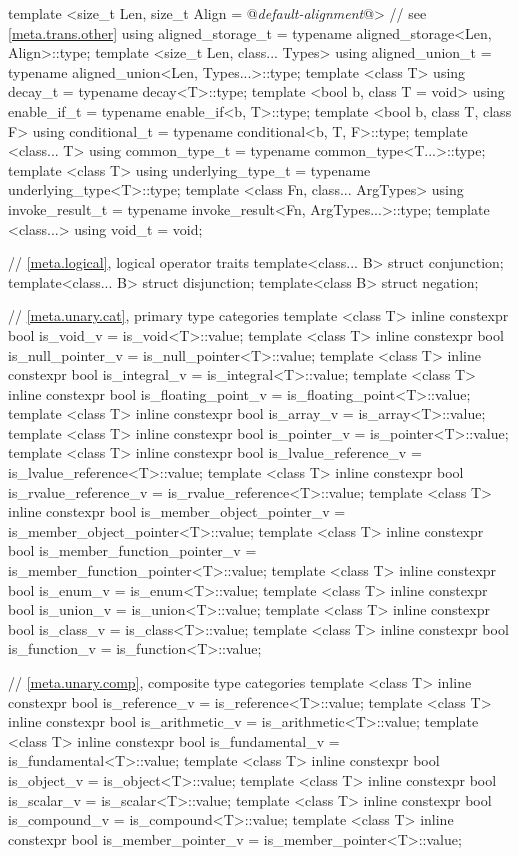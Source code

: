\begin{codeblock}
{  template <size_t Len,
            size_t Align = @\textit{default-alignment}@> // see \ref{meta.trans.other}
    using aligned_storage_t = typename aligned_storage<Len, Align>::type;
  template <size_t Len, class... Types>
    using aligned_union_t   = typename aligned_union<Len, Types...>::type;
  template <class T>
    using decay_t           = typename decay<T>::type;
  template <bool b, class T = void>
    using enable_if_t       = typename enable_if<b, T>::type;
  template <bool b, class T, class F>
    using conditional_t     = typename conditional<b, T, F>::type;
  template <class... T>
    using common_type_t     = typename common_type<T...>::type;
  template <class T>
    using underlying_type_t = typename underlying_type<T>::type;
  template <class Fn, class... ArgTypes>
    using invoke_result_t   = typename invoke_result<Fn, ArgTypes...>::type;
  template <class...>
    using void_t            = void;

  // \ref{meta.logical}, logical operator traits
  template<class... B> struct conjunction;
  template<class... B> struct disjunction;
  template<class B> struct negation;

  // \ref{meta.unary.cat}, primary type categories
  template <class T> inline constexpr bool is_void_v
    = is_void<T>::value;
  template <class T> inline constexpr bool is_null_pointer_v
    = is_null_pointer<T>::value;
  template <class T> inline constexpr bool is_integral_v
    = is_integral<T>::value;
  template <class T> inline constexpr bool is_floating_point_v
    = is_floating_point<T>::value;
  template <class T> inline constexpr bool is_array_v
    = is_array<T>::value;
  template <class T> inline constexpr bool is_pointer_v
    = is_pointer<T>::value;
  template <class T> inline constexpr bool is_lvalue_reference_v
    = is_lvalue_reference<T>::value;
  template <class T> inline constexpr bool is_rvalue_reference_v
    = is_rvalue_reference<T>::value;
  template <class T> inline constexpr bool is_member_object_pointer_v
    = is_member_object_pointer<T>::value;
  template <class T> inline constexpr bool is_member_function_pointer_v
    = is_member_function_pointer<T>::value;
  template <class T> inline constexpr bool is_enum_v
    = is_enum<T>::value;
  template <class T> inline constexpr bool is_union_v
    = is_union<T>::value;
  template <class T> inline constexpr bool is_class_v
    = is_class<T>::value;
  template <class T> inline constexpr bool is_function_v
    = is_function<T>::value;

  // \ref{meta.unary.comp}, composite type categories
  template <class T> inline constexpr bool is_reference_v
    = is_reference<T>::value;
  template <class T> inline constexpr bool is_arithmetic_v
    = is_arithmetic<T>::value;
  template <class T> inline constexpr bool is_fundamental_v
    = is_fundamental<T>::value;
  template <class T> inline constexpr bool is_object_v
    = is_object<T>::value;
  template <class T> inline constexpr bool is_scalar_v
    = is_scalar<T>::value;
  template <class T> inline constexpr bool is_compound_v
    = is_compound<T>::value;
  template <class T> inline constexpr bool is_member_pointer_v
    = is_member_pointer<T>::value;

}
\end{codeblock}
